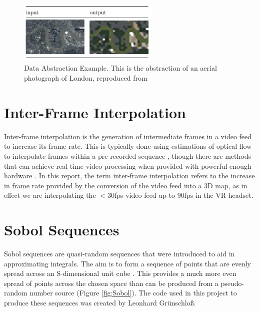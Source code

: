 
\begin{figure}[H]
    \begin{center}
      \includegraphics[width=0.6\textwidth]{Figures/abstraction3rdyear.png}
      \caption[Data Abstraction Example]{Data Abstraction Example. This is the abstraction of an aerial photograph of London, reproduced from \cite{abstraction3rdyear}}
      \label{fig:abstraction3rdyear}
    \end{center}
\end{figure}

\section{Inter-Frame Interpolation}

Inter-frame interpolation is the generation of intermediate frames in a video feed to increase its frame rate. This is typically done using estimations of optical flow to interpolate frames within a pre-recorded sequence \cite{ribas1993interframe}, though there are methods that can achieve real-time video processing when provided with powerful enough hardware \cite{shi2016real}. In this report, the term inter-frame interpolation refers to the increase in frame rate provided by the conversion of the video feed into a 3D map, as in effect we are interpolating the $<$30fps video feed up to 90fps in the VR headset.

\section{Sobol Sequences}
\label{Subsection:sobol}

Sobol sequences are quasi-random sequences that were introduced to aid in approximating integrals. The aim is to form a sequence of points that are evenly spread across an S-dimensional unit cube \cite{joe2008constructing}. This provides a much more even spread of points across the chosen space than can be produced from a pseudo-random number source (Figure \ref{fig:Sobol}). The code used in this project to produce these sequences was created by Leonhard Gr\"unschlo\ss\space \cite{CodeSource}.


